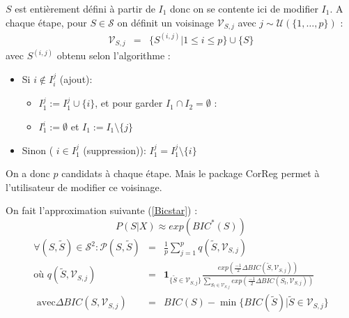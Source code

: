 \documentclass[12pt]{article}
\begin{document}
	$S$ est entièrement défini à partir de $I_1$ donc on se contente ici de modifier $I_1$. %
	A chaque étape, pour $S \in \mathcal{S}$ on définit un voisinage $\mathcal{V}_{S,j}$ avec $j \sim \mathcal{U}(\{1,\dots,p\}) $ :%
	\begin{eqnarray}
		\mathcal{V}_{S,j}&=&\{ S^{(i,j)} | 1\leq i\leq p \} \cup\{S \}
	\end{eqnarray}	
	avec $S^{(i,j)}$ obtenu selon l'algorithme :
	\begin{itemize}
		\item Si $i \notin I_i^j$ (ajout): 
			\begin{itemize}
				\item $I_1^j :=I_1^j\cup \{i\}$, et pour garder $I_1\cap I_2=\emptyset$ :
				\item $I_1^i :=\emptyset$ et $I_1:=I_1 \setminus \{j\}$
			\end{itemize}			 
		\item Sinon ( $i \in I_1^j$ (suppression)): $I_1^j=I_1^j\setminus \{i\}$
	\end{itemize}
	
	On a donc $p$ candidats à chaque étape. Mais le package CorReg permet à l'utilisateur de modifier ce voisinage.
	
		
	On fait l'approximation suivante  (\ref{Bicstar}) : 
	\begin{equation}
		P(S|X)\approx exp(BIC^*(S))
	\end{equation}
	\begin{eqnarray}
			\forall (S,\tilde{S}) \in \mathcal{S}^2 : \mathcal{P}(S,\tilde{S})&=& \frac{1}{p} \sum_{j=1}^p q(\tilde{S},\mathcal{V}_{S,j}) \\
	\textrm{où }	q(\tilde{S},\mathcal{V}_{S,j})&=&\mathbf{1}_{ \{\tilde{S}\in \mathcal{V}_{S,j}\} }\frac{exp(\frac{-1}{2}\Delta BIC(\tilde{S},\mathcal{V}_{S,j}))}{\sum_{S_l\in \mathcal{V}_{S,j}}exp(\frac{-1}{2}\Delta BIC(S_l,\mathcal{V}_{S,j}))} \\
	\textrm{ avec} \Delta BIC(S,\mathcal{V}_{S,j})&=&BIC(S)-\min\{BIC(\tilde{S})| \tilde{S} \in \mathcal{V}_{S,j} \}
	\end{eqnarray}
	
\end{document}
